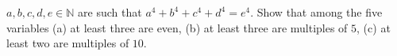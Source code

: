 $a, b, c, d, e \in \mathbb{N}$ are such that $a^4 + b^4 + c^4 + d^4 = e^4$. Show that among the five variables (a) at least three are even, (b) at least three are multiples of $5$, (c) at least two are multiples of $10$.
